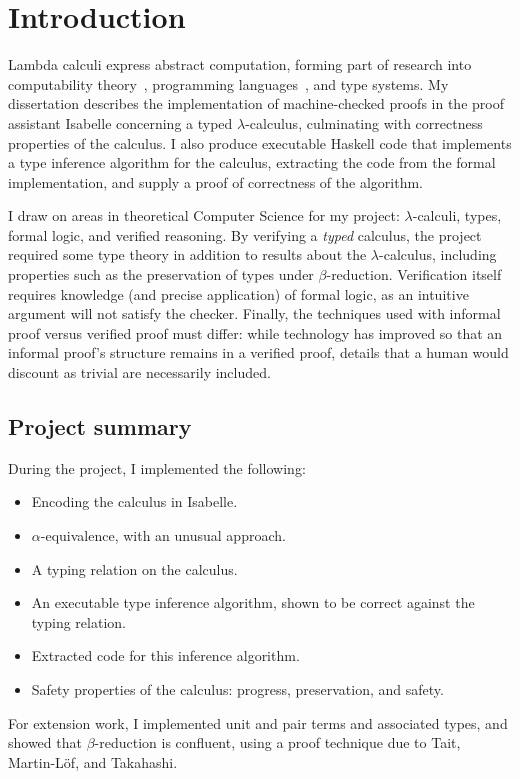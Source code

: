 \chapter{Introduction}
Lambda calculi express abstract computation, forming part of research into computability theory~\cite{lambda-computability}, programming languages~\cite{lambda-programming}, and type systems.
My dissertation describes the implementation of machine-checked proofs in the proof assistant Isabelle concerning a typed \(\lambda\)-calculus, culminating with correctness properties of the calculus.
I also produce executable Haskell code that implements a type inference algorithm for the calculus, extracting the code from the formal implementation, and supply a proof of correctness of the algorithm.

I draw on areas in theoretical Computer Science for my project: \(\lambda\)-calculi, types, formal logic, and verified reasoning.
By verifying a \emph{typed} calculus, the project required some type theory in addition to results about the \(\lambda\)-calculus, including properties such as the preservation of types under \(\beta\)-reduction.
Verification itself requires knowledge (and precise application) of formal logic, as an intuitive argument will not satisfy the checker.
Finally, the techniques used with informal proof versus verified proof must differ: while technology has improved so that an informal proof's structure remains in a verified proof, details that a human would discount as trivial are necessarily included.

\section{Project summary}
During the project, I implemented the following:
\begin{itemize}
\item
Encoding the calculus in Isabelle.
\item
\(\alpha\)-equivalence, with an unusual approach.
\item
A typing relation on the calculus.
\item
An executable type inference algorithm, shown to be correct against the typing relation.
\item
Extracted code for this inference algorithm.
\item
Safety properties of the calculus: progress, preservation, and safety.
\end{itemize}

For extension work, I implemented unit and pair terms and associated types, and showed that \(\beta\)-reduction is confluent, using a proof technique due to Tait, Martin-L\"of, and Takahashi.

